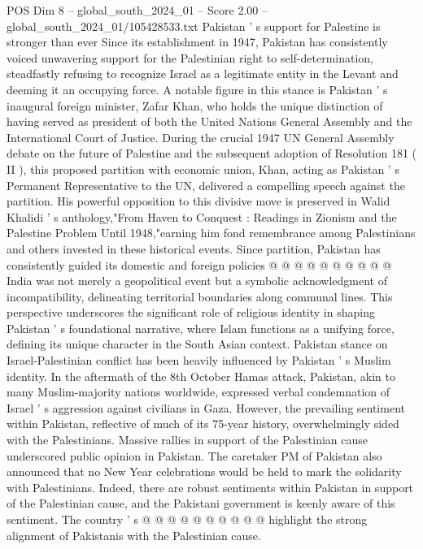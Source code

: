 \begin{textsample}{POS Dim 8 – global\_south\_2024\_01 – Score 2.00 – global\_south\_2024\_01/105428533.txt}  \label{ex:f8_pos_400}
Pakistan ' s support for Palestine is stronger than ever Since its establishment in 1947, Pakistan has consistently voiced unwavering support for the Palestinian right to self-determination, steadfastly refusing to recognize Israel as a legitimate entity in the Levant and deeming it an occupying force.
A notable figure in this stance is Pakistan ' s inaugural foreign minister, Zafar Khan, who holds the unique distinction of having served as president of both the United Nations General Assembly and the International Court of Justice.
During the crucial 1947 UN General Assembly debate on the future of Palestine and the subsequent adoption of Resolution 181 ( II ), this proposed partition with economic union, Khan, acting as Pakistan ' s Permanent Representative to the UN, delivered a compelling speech against the partition.
His powerful opposition to this divisive move is preserved in Walid Khalidi ' s anthology,"From Haven to Conquest : Readings in Zionism and the Palestine Problem Until 1948,"earning him fond remembrance among Palestinians and others invested in these historical events.
Since partition, Pakistan has consistently guided its domestic and foreign policies @ @ @ @ @ @ @ @ @ @ India was not merely a geopolitical event but a symbolic acknowledgment of incompatibility, delineating territorial boundaries along communal lines.
This perspective underscores the significant role of religious identity in shaping Pakistan ' s foundational narrative, where Islam functions as a unifying force, defining its unique character in the South Asian context.
Pakistan stance on Israel-Palestinian conflict has been heavily influenced by Pakistan ' s Muslim identity.
In the aftermath of the 8th October Hamas attack, Pakistan, akin to many Muslim-majority nations worldwide, expressed verbal condemnation of Israel ' s aggression against civilians in Gaza.
However, the prevailing sentiment within Pakistan, reflective of much of its 75-year history, overwhelmingly sided with the Palestinians.
Massive rallies in support of the Palestinian cause underscored public opinion in Pakistan.
The caretaker PM of Pakistan also announced that no New Year celebrations would be held to mark the solidarity with Palestinians.
Indeed, there are robust sentiments within Pakistan in support of the Palestinian cause, and the Pakistani government is keenly aware of this sentiment.
The country ' s @ @ @ @ @ @ @ @ @ @ highlight the strong alignment of Pakistanis with the Palestinian cause.

\end{textsample}
